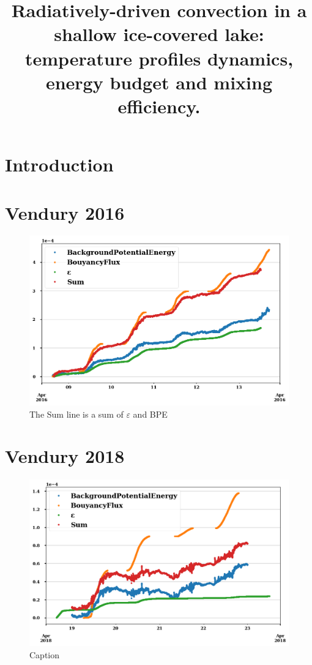 \documentclass{article}
\title{Radiatively-driven convection in a shallow ice-covered lake: 
temperature profiles dynamics, energy budget and mixing efficiency.
}
\begin{document}
\maketitle

\section{Introduction}

\section{Vendury 2016}

\begin{figure}
    \centering
    \includegraphics[width=\textwidth]{vend2016.png}
    \caption{The Sum line is a sum of $\varepsilon$ and BPE}
    \label{fig:my_label}
\end{figure}

\section{Vendury 2018}

\begin{figure}
    \centering
    \includegraphics[width=\textwidth]{vend2018.png}
    \caption{Caption}
    \label{fig:vend2018}
\end{figure}
\end{document}
